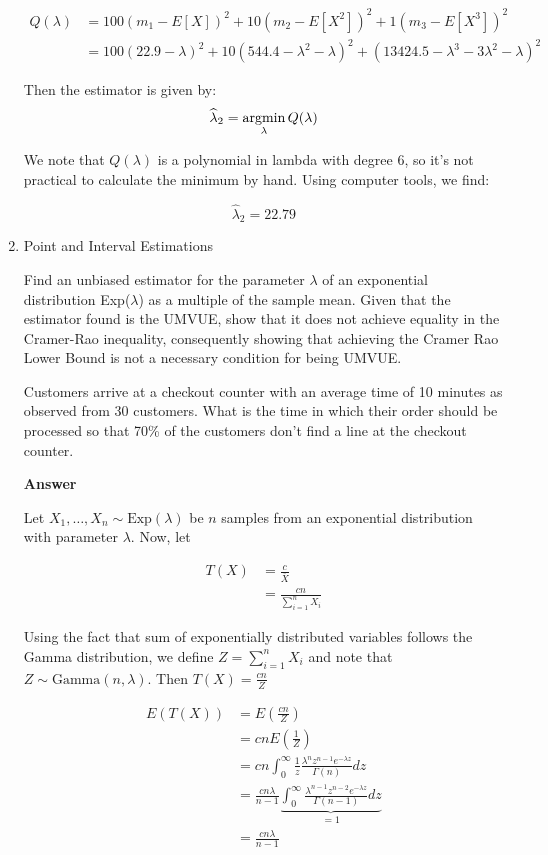 \documentclass[12pt, oneside]{article}
\newcommand{\argmin}{\operatornamewithlimits{argmin}}
\begin{document}
\begin{enumerate}
{  \begin{align*}
    Q(\lambda) &= 100(m_1 - E[X])^2 + 10(m_2 - E[X^2])^2 + 1(m_3 - E[X^3])^2 \\
               &= 100(22.9 - \lambda)^2 + 10(544.4 - \lambda^2 - \lambda)^2 + (13424.5 - \lambda^3 - 3\lambda^2 - \lambda)^2
  \end{align*}

  Then the estimator is given by:
  \[\widehat{\lambda}_2 = \argmin_\lambda{Q(\lambda)}\]

  We note that \(Q(\lambda)\) is a polynomial in lambda with degree 6, so it's not practical
  to calculate the minimum by hand. Using computer tools, we find:

  \[\widehat{\lambda}_2 = 22.79\]
}


\item	{
  Point and Interval Estimations

  Find an unbiased estimator for the parameter \(\lambda\) of an exponential 
  distribution Exp(\(\lambda\)) as a multiple of the sample mean. Given that the
  estimator found is the UMVUE, show that it does not achieve
  equality in the Cramer-Rao inequality, consequently showing that achieving the
  Cramer Rao Lower Bound is not a necessary condition for being UMVUE.

  Customers arrive at a checkout counter with an average time of 10 minutes as observed
  from 30 customers.
  What is the time in which their order should be processed so that 70\% of the customers
  don't find a line at the checkout counter.
  
  \textbf{Answer}

  Let \(X_1, \ldots, X_n \sim \text{Exp}(\lambda)\) be \(n\) samples from an exponential
  distribution with parameter \(\lambda\). Now, let

  \begin{align*}
    T(X) &= \frac{c}{\overline{X}} \\
         &= \frac{cn}{\sum_{i=1}^{n} X_i}
  \end{align*}

  Using the fact that sum of exponentially distributed variables follows the Gamma distribution,
  we define \(Z = \sum_{i = 1}^{n} X_i\) and note that \(Z \sim \text{Gamma}(n, \lambda)\).
  Then \(T(X) = \frac{cn}{Z}\)

  \begin{align*}
    E(T(X)) &= E\left(\frac{cn}{Z}\right) \\
            &= cn E\left(\frac{1}{Z}\right) \\
            &= cn \int_{0}^{\infty} \frac{1}{z} \frac{\lambda^n z^{n-1} e^{-\lambda z}}{\Gamma(n)} dz \tag*{(\(\because Z \sim Gamma(n, \lambda)\))} \\
            &= \frac{cn\lambda}{n-1} \underbrace{\int_{0}^{\infty} \frac{\lambda^{n-1} z^{n-2} e^{-\lambda z}}{\Gamma(n-1)} dz}_{ = 1} \tag*{(\(\because \Gamma(n) = (n-1) \Gamma(n-1)\))} \\
            &= \frac{cn\lambda}{n-1}
  \end{align*}

}
\end{enumerate}
\end{document}
